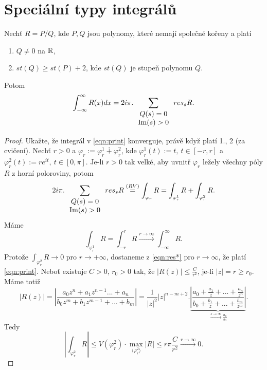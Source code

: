\section{Speciální typy integrálů}
\begin{theorem}
Nechť $R=P/Q$, kde $P,Q$ jsou polynomy, které nemají společné kořeny a platí 
\begin{enumerate}
    \item $Q\neq0$ na $\operatorname{\mathbb{R}} $,
    \item $st(Q)\geq st(P)+2$, kde $st(Q)$ je stupeň polynomu $Q$.
\end{enumerate}
Potom
\begin{equation}
    \int_{-\infty}^\infty{R(x)dx}=2i\pi.\sum_{\begin{array}{cc}
         Q(s)=0  \\
         \operatorname{Im}(s)>0 
    \end{array}}{res_s{R}}.
    \label{eqn:print}
\end{equation}
\end{theorem}
\begin{proof}
Ukažte, že integrál v \cref{eqn:print} konverguje, právě když platí 1., 2 (za cvičení). Nechť $r>0$ a $\varphi_r:=\varphi^1_r\dotplus\varphi^2_r$, kde $\varphi^1_r(t):=t,\ t\in[-r,r]$ a $\varphi^2_r(t):=re^{it},\ t\in[0,\pi]$. Je-li $r>0$ tak velké, aby uvnitř $\varphi_r$ ležely všechny póly $R$ z horní poloroviny, potom
\begin{equation}
    2i\pi.\sum_{\begin{array}{cc}
         Q(s)=0  \\
         \operatorname{Im}(s)>0 
    \end{array}}{res_s{R}}
    \overset{(RV)}{=}
    \int_{\varphi_r}{R}=
    \int_{\varphi_r^1}{R} +\int_{\varphi_r^2}{R}.
    \label{eqn:res*}
\end{equation}
Máme 
$$\int_{\varphi_r^1}{R}=
\int_{-r}^r{R}\overset{r\to\infty}{\longrightarrow}
\int_{-\infty}^\infty{R}.$$
Protože $\int_{\varphi_r^2}{R}\to{0}$ pro $r\to{+\infty}$, dostaneme z \cref{eqn:res*} pro $r\to\infty$, že platí \cref{eqn:print}.  Neboť existuje $C>0$, $r_0>0$ tak, že $|R(z)|\leq\frac{C}{r^2}$, je-li $|z|=r\geq{r_0}$. Máme totiž
$$|R(z)|=\left|\frac{a_0 z^n+a_1 z^{n-1}...+a_n}{b_0 z^m+b_1 z^{m-1}+...+b_m}\right|=\frac{1}{|z|^2}|z|^{n-m+2}.\underset{\overset{z\to\infty}{\longrightarrow}\frac{a_0}{b_0}}{\underbrace{\left|\frac{a_0+\frac{a_1}{z}+...+\frac{a_n}{z^n}}{b_0+\frac{b_1}{z}+...+\frac{b_m}{z^m}}\right|}}.$$
Tedy
$$\left|\int_{\varphi^2_r}{R}\right|\leq V(\varphi^2_r)\cdot\max_{\langle{\varphi^2_r}\rangle}{|R|}
\leq r\pi\frac{C}{r^2}\overset{r\to\infty}{\longrightarrow}0.$$
\end{proof}

